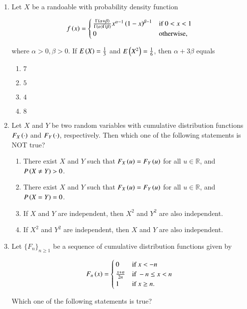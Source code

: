 \documentclass[journal]{IEEEtran}
\numberwithin{equation}{enumi}
\numberwithin{figure}{enumi}
\newcommand{\lt}{<}
\newcommand{\gt}{>}
\begin{document}
\begin{enumerate}
\item Let $X$ be a randoable with probability density function

\[
f\brak{x} = \begin{cases}
\frac{\Gamma\brak{\alpha+\beta}}{\Gamma\brak{\alpha}\Gamma\brak{\beta}}x^{\alpha-1}\brak{1-x}^{\beta-1} & \text{if } 0 \lt x \lt 1 \\
0 & \text{otherwise,}
\end{cases} 
\]

where $\alpha \gt 0, \beta \gt 0$. If $E\left(X\right) = \frac{1}{3}$ and $E\left(X^2\right) = \frac{1}{6}$, then $\alpha + 3\beta$ equals

\begin{enumerate}
    \item $7$
    \item $5$
    \item $4$
    \item $8$
\end{enumerate}

\item Let $X$ and $Y$ be two random variables with cumulative distribution functions $F_X\left(\cdot\right)$ and $F_Y\left(\cdot\right)$, respectively. Then which one of the following statements is NOT true?

\begin{enumerate}
    \item There exist $X$ and $Y$ such that $F_X\left(u\right) = F_Y\left(u\right)$ for all $u \in \mathbb{R}$, and $P\brak{X \neq Y} \gt 0$.
    \item There exist $X$ and $Y$ such that $F_X\left(u\right) = F_Y\left(u\right)$ for all $u \in \mathbb{R}$, and $P\left(X = Y\right) = 0$.
    \item If $X$ and $Y$ are independent, then $X^2$ and $Y^2$ are also independent.
    \item If $X^2$ and $Y^2$ are independent, then $X$ and $Y$ are also independent.
\end{enumerate}

\item Let $\{F_n\}_{n\geq1}$ be a sequence of cumulative distribution functions given by 

\[
F_n\brak{x} = \begin{cases}
0 & \text{if } x \lt -n \\
\frac{x+n}{2n} & \text{if } -n \leq x \lt n \\
1 & \text{if } x \geq n.
\end{cases}
\]

Which one of the following statements is true?


\end{enumerate}
\end{document}
